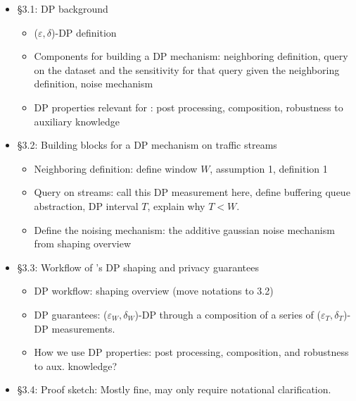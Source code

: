 \noindent
{}
\begin{itemize}
    \item \S 3.1: DP background
    \begin{itemize}
        \item ($\varepsilon, \delta$)-DP definition
        \item Components for building a DP mechanism: neighboring definition,
        query on the dataset and the sensitivity for that query given the
        neighboring definition, noise mechanism
        \item DP properties relevant for {\sys}: post processing, composition,
        robustness to auxiliary knowledge
    \end{itemize}
    \item \S 3.2: Building blocks for a DP mechanism on traffic streams
    \begin{itemize}
        \item Neighboring definition: define window $W$, assumption 1,
        definition 1
        \item Query on streams: call this DP measurement here, define buffering
        queue abstraction, DP interval $T$, explain why $T < W$.
        \item Define the noising mechanism: the additive gaussian noise
        mechanism from shaping overview
    \end{itemize}
    \item \S 3.3: Workflow of {\sys}'s DP shaping and privacy guarantees
    \begin{itemize}
        \item DP workflow: shaping overview (move notations to 3.2)
        \item DP guarantees: ($\varepsilon_W, \delta_W$)-DP through a
        composition of a series of ($\varepsilon_T, \delta_T$)-DP measurements.
        \item How we use DP properties: post processing, composition, and
        robustness to aux. knowledge?
    \end{itemize}
    \item \S 3.4: Proof sketch: Mostly fine, may only require notational
    clarification.
\end{itemize}

